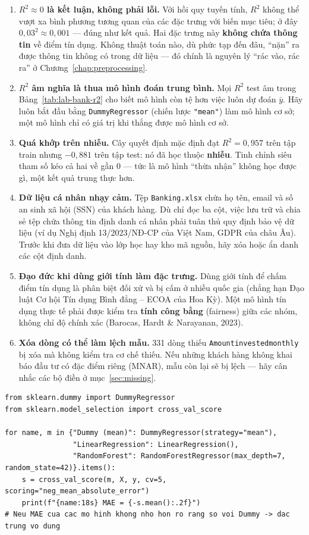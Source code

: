 \begin{enumerate}
    \item \textbf{$R^2 \approx 0$ là kết luận, không phải lỗi.} Với hồi quy tuyến tính, $R^2$ không thể vượt xa bình phương tương quan của các đặc trưng với biến mục tiêu; ở đây $0{,}03^2 \approx 0{,}001$ --- đúng như kết quả. Hai đặc trưng này \textbf{không chứa thông tin} về điểm tín dụng. Không thuật toán nào, dù phức tạp đến đâu, ``nặn'' ra được thông tin không có trong dữ liệu --- đó chính là nguyên lý ``rác vào, rác ra'' ở Chương~\ref{chap:preprocessing}.
    \item \textbf{$R^2$ âm nghĩa là thua mô hình đoán trung bình.} Mọi $R^2$ test âm trong Bảng~\ref{tab:lab-bank-r2} cho biết mô hình còn tệ hơn việc luôn dự đoán $\bar{y}$. Hãy luôn bắt đầu bằng \texttt{DummyRegressor} (chiến lược \texttt{"mean"}) làm mô hình cơ sở; một mô hình chỉ có giá trị khi thắng được mô hình cơ sở.
    \item \textbf{Quá khớp trên nhiễu.} Cây quyết định mặc định đạt $R^2 = 0{,}957$ trên tập train nhưng $-0{,}881$ trên tập test: nó đã học thuộc \textbf{nhiễu}. Tinh chỉnh siêu tham số kéo cả hai về gần 0 --- tức là mô hình ``thừa nhận'' không học được gì, một kết quả trung thực hơn.
    \item \textbf{Dữ liệu cá nhân nhạy cảm.} Tệp \texttt{Banking.xlsx} chứa họ tên, email và số an sinh xã hội (SSN) của khách hàng. Dù chỉ đọc ba cột, việc lưu trữ và chia sẻ tệp chứa thông tin định danh cá nhân phải tuân thủ quy định bảo vệ dữ liệu (ví dụ Nghị định 13/2023/NĐ-CP của Việt Nam, GDPR của châu Âu). Trước khi đưa dữ liệu vào lớp học hay kho mã nguồn, hãy xóa hoặc ẩn danh các cột định danh.
    \item \textbf{Đạo đức khi dùng giới tính làm đặc trưng.} Dùng giới tính để chấm điểm tín dụng là phân biệt đối xử và bị cấm ở nhiều quốc gia (chẳng hạn Đạo luật Cơ hội Tín dụng Bình đẳng -- ECOA của Hoa Kỳ). Một mô hình tín dụng thực tế phải được kiểm tra \textbf{tính công bằng} (fairness) giữa các nhóm, không chỉ độ chính xác (Barocas, Hardt \& Narayanan, 2023).
    \item \textbf{Xóa dòng có thể làm lệch mẫu.} 331 dòng thiếu \texttt{Amountinvestedmonthly} bị xóa mà không kiểm tra cơ chế thiếu. Nếu những khách hàng không khai báo đầu tư có đặc điểm riêng (MNAR), mẫu còn lại sẽ bị lệch --- hãy cân nhắc các bộ điền ở mục~\ref{sec:missing}.
\end{enumerate}

\begin{lstlisting}[caption={Lab 2 -- so sánh với mô hình cơ sở}]
from sklearn.dummy import DummyRegressor
from sklearn.model_selection import cross_val_score

for name, m in {"Dummy (mean)": DummyRegressor(strategy="mean"),
                "LinearRegression": LinearRegression(),
                "RandomForest": RandomForestRegressor(max_depth=7, random_state=42)}.items():
    s = cross_val_score(m, X, y, cv=5, scoring="neg_mean_absolute_error")
    print(f"{name:18s} MAE = {-s.mean():.2f}")
# Neu MAE cua cac mo hinh khong nho hon ro rang so voi Dummy -> dac trung vo dung
\end{lstlisting}

